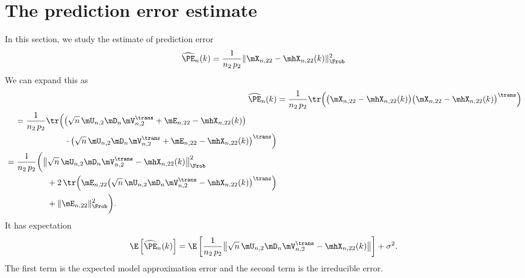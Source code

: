 \section{The prediction error estimate}\label{S:bcv-pe-estimate}

In this section, we study the estimate of prediction error
\[
	\widehat{\PE}_n(k)
		=
			\frac{1}{n_2 \, p_2}
			\| \mX_{n,22} - \mhX_{n,22}(k) \|_\Frob^2
\]
We can expand this as
\begin{align}
	\widehat{\PE}_n(k)
		&=
			\frac{1}{n_2 \, p_2}
			\tr \Big(
				\big(
					\mX_{n,22} - \mhX_{n,22}(k)
				\big)
				\big(
					\mX_{n,22} - \mhX_{n,22}(k)
				\big)^\trans
			\Big) \notag \\
	\begin{split}
		&=
			\frac{1}{n_2 \, p_2}
			\tr \Big(
				\big(
					\sqrt{n} \, \mU_{n,2} \mD_n \mV_{n,2}^\trans 
					+
					\mE_{n,22}
					- 
					\mhX_{n,22}(k)
				\big) \\
				&\qquad\qquad\qquad\cdot
				\big(
					\sqrt{n} \, \mU_{n,2} \mD_n \mV_{n,2}^\trans 
					+
					\mE_{n,22}
					- 
					\mhX_{n,22}(k)
				\big)^\trans
			\Big)
	\end{split} \notag \\
	\begin{split}
		&=
			\frac{1}{n_2 \, p_2}
			\bigg(
				\big\| 
					\sqrt{n} \, \mU_{n,2} \mD_n \mV_{n,2}^\trans
					-
					\mhX_{n,22}(k)
				\big\|_\Frob^2 \\
				&\qquad\qquad\quad+
				2 \, 
				\tr \Big(
					\mE_{n,22}
					\big(
						\sqrt{n} \, \mU_{n,2} \mD_n \mV_{n,2}^\trans 
						- 
						\mhX_{n,22}(k)
					\big)^\trans
				\Big) \\
				&\qquad\qquad\quad+
				\|
					\mE_{n,22}
				\|_\Frob^2
			\bigg).
	\end{split}
\end{align}
It has expectation
\begin{equation}
	\E \left[ \widehat{\PE}_n(k) \right]
		=
			\E \left[
				\frac{1}{n_2 \, p_2}
				\big\| 
					\sqrt{n} \, \mU_{n,2} \mD_n \mV_{n,2}^\trans
					-
					\mhX_{n,22}(k)
				\big\|
			\right]
			+
			\sigma^2.
\end{equation}
The first term is the expected model approximation error and the second term is the irreducible error.

